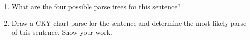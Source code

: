 \documentclass[11pt,twoside]{article}
\begin{document}
\begin{enumerate}
\item What are the four possible parse trees for this sentence?
\item Draw a CKY chart parse for the sentence and determine the most likely parse of this sentence.  Show your work.
\end{enumerate}
\end{document}
